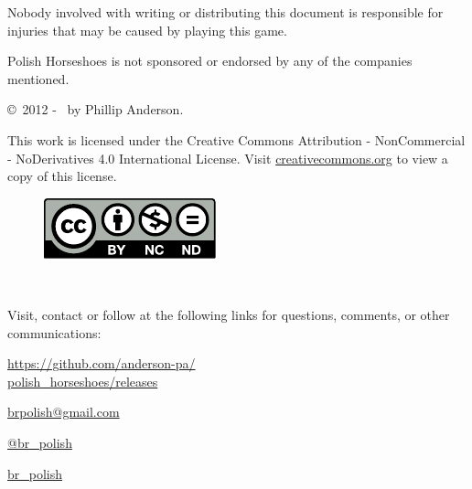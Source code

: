 \documentclass[11pt,letterpaper,twocolumn,english,DIV=calc]{scrartcl}
\begin{document}

Nobody involved with writing or distributing this document is responsible for injuries that may be caused by playing this game.

\medskip{}\noindent Polish Horseshoes is not sponsored or endorsed by any of the companies mentioned.


\copyright\ 2012 - \the\year\ by Phillip Anderson. 

\noindent This work is licensed under the Creative Commons Attribution
- NonCommercial - NoDerivatives 4.0 International License. 
Visit \href{http://creativecommons.org/licenses/by-nc-nd/4.0/}{creativecommons.org} to view a copy of this license.

\begin{figure}[!ht]
	\includegraphics[width=\columnwidth]{images/by-nc-nd}
\end{figure}

\newpage{}

\ \vfill{}

\noindent Visit, contact or follow at the following links for questions, comments, or other communications:

\begin{description}[listparindent=1.cm, font=\normalfont]
	\item[{\faGlobe}] \href{https://github.com/anderson-pa/polish_horseshoes/releases}{https://github.com/anderson-pa/\\\indent polish\_horseshoes/releases}

	\item[\faEnvelopeO] \href{mailto:brpolish@gmail.com}{brpolish@gmail.com}

	\item[\faTwitter] \href{http://www.twitter.com/br_polish}{@br\_{}polish}

	\item[\faTwitch] \href{http://www.twitch.tv/br_polish}{br\_{}polish}
\end{description}
\end{document}
